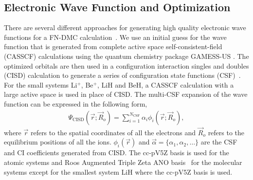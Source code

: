 \documentclass[pra,superscriptaddress,groupedaddress,twocolumn]{revtex4}
\begin{document}
\subsection{Electronic Wave Function and Optimization}

There are several different approaches for generating high quality electronic wave functions for a FN-DMC calculation~\cite{Umrigar_Alleviation,Toulouse_Bench,Brown_Bench,Seth_Bench}. We use an initial guess for the wave function that is generated from complete active space self-consistent-field (CASSCF) \cite{Chaban_MCSCF,Szabo} calculations using the quantum chemistry package GAMESS-US \cite{GAMESS}. The optimized orbitals are then used in a configuration interaction singles and doubles (CISD) calculation to generate a series of configuration state functions (CSF)~\cite{Pauncz_CSF}. For the small systems Li$^+$, Be$^+$, LiH and BeH, a CASSCF calculation with a large active space is used in place of CISD. The multi-CSF expansion of the wave function can be expressed in the following form,
\begin{align}
\Psi_{\text{CISD}}(\vec{r};\vec{R}_o)=\sum\limits_{i=1}^{N_{\text{CSF}}}\alpha_i\phi_i(\vec{r};\vec{R}_o), \label{eq:psi_gms}
\end{align}
where $\vec{r}$ refers to the spatial coordinates of all the electrons and $\vec{R}_o$ refers to the equilibrium positions of all the ions. $\phi_i(\vec{r})$ and $\vec{\alpha}=\{\alpha_1,\alpha_2,\dots\}$ are the CSF and CI coefficients generated from CISD. The cc-pV5Z basis \cite{dunning} is used for the atomic systems and Roos Augmented Triple Zeta ANO basis~\cite{roos} for the molecular systems except for the smallest system LiH where the cc-pV5Z basis is used.
\end{document}
